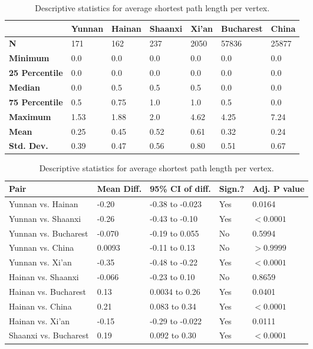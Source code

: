 \begin{table}[h]
	\begin{mdframed}
		\begin{tabular*}{\linewidth}{l|llllll}
			\hline
			\textbf{ } & \textbf{Yunnan} & \textbf{Hainan} & \textbf{Shaanxi} & \textbf{Xi'an} & \textbf{Bucharest} & \textbf{China}\\
			\hline
			\textbf{N} & 171 & 162 & 237 & 2050 & 57836 & 25877\\
			\textbf{Minimum} & 0.0 & 0.0 & 0.0 & 0.0 & 0.0 & 0.0\\
			\textbf{25 Percentile} & 0.0 & 0.0 & 0.0 & 0.0 & 0.0 & 0.0\\
			\textbf{Median} & 0.0 & 0.5 & 0.5 & 0.5 & 0.0 & 0.0\\
			\textbf{75 Percentile} & 0.5 & 0.75 & 1.0 & 1.0 & 0.5 & 0.0\\
			\textbf{Maximum} & 1.53 & 1.88 & 2.0 & 4.62 & 4.25 & 7.24\\
			\textbf{Mean} & 0.25 & 0.45 & 0.52 & 0.61 & 0.32 & 0.24\\
			\textbf{Std. Dev.} & 0.39 & 0.47 & 0.56 & 0.80 & 0.51 & 0.67\\
			\hline
		\end{tabular*}
		\caption{Descriptive statistics for average shortest path length per vertex.}
		\label{tab:avg_shortest_path_desc}
		\vskip 10pt
		\small
		\begin{tabular*}{\linewidth}{l|llll}
			\hline
			\textbf{Pair} & \textbf{Mean Diff.} & \textbf{95\% CI of diff.} & \textbf{Sign.?} & \textbf{Adj. P value}\\
			\hline
			Yunnan vs. Hainan & -0.20 & -0.38 to -0.023 & Yes & 0.0164\\
			Yunnan vs. Shaanxi & -0.26 & -0.43 to -0.10 & Yes & $<0.0001$\\
			Yunnan vs. Bucharest & -0.070 & -0.19 to 0.055 & No & 0.5994\\
			Yunnan vs. China & 0.0093 & -0.11 to 0.13 & No & $>0.9999$\\
			Yunnan vs. Xi'an & -0.35 & -0.48 to -0.22 & Yes & $<0.0001$\\
			Hainan vs. Shaanxi & -0.066 & -0.23 to 0.10 & No & 0.8659\\
			Hainan vs. Bucharest & 0.13 & 0.0034 to 0.26 & Yes & 0.0401\\
			Hainan vs. China & 0.21 & 0.083 to 0.34 & Yes & $<0.0001$\\
			Hainan vs. Xi'an & -0.15 & -0.29 to -0.022 & Yes & 0.0111\\
			Shaanxi vs. Bucharest & 0.19 & 0.092 to 0.30 & Yes & $<0.0001$\\

\end{tabular*}
\end{mdframed}
\end{table}
